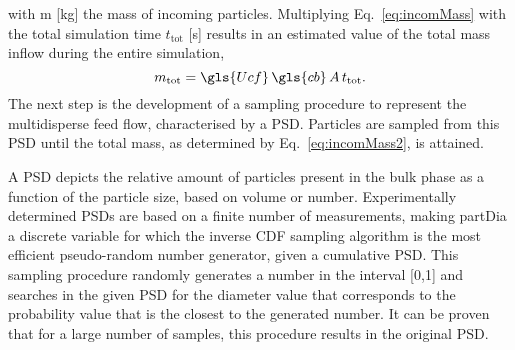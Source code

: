 with \gls{m} [\unit{\kilogram}] the mass of incoming particles. Multiplying Eq.\ \eqref{eq:incomMass} with the total simulation time $t_\mathrm{tot}$ [\unit{\second}] results in an estimated value of the total mass inflow during the entire simulation,
\begin{equation}
 m_\mathrm{tot} = \gls{Ucf}\, \gls{cb}\, A\,  t_\mathrm{tot} .
\label{eq:incomMass2} 
\end{equation}
The next step is the development of a sampling procedure to represent the multidisperse feed flow, characterised by a \gls{PSD}. Particles are sampled from this \gls{PSD} until the total mass, as determined by Eq.\ \eqref{eq:incomMass2}, is attained. \par
A \gls{PSD} depicts the relative amount of particles present in the bulk phase as a function of the particle size, based on volume or number. Experimentally determined \gls{PSD}s are based on a finite number of measurements, making \gls{partDia} a discrete variable for which the inverse \gls{CDF} sampling algorithm is the most efficient pseudo-random number generator, given a cumulative \gls{PSD}. %
This sampling procedure randomly generates a number in the interval [0,1] and searches in the given \gls{PSD} for the diameter value that corresponds to the probability value that is the closest to the generated number. It can be proven that for a large number of samples, this procedure results in the original \gls{PSD}.\\ \\
